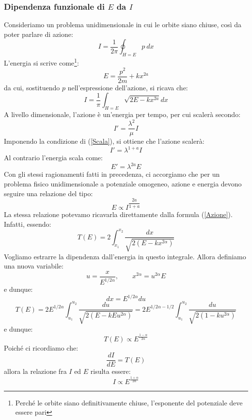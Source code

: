 \documentclass[a4paper,openany]{article}
\begin{document}
	\subsubsection{Dipendenza funzionale di $E$ da $I$}
	Consideriamo un problema unidimensionale in cui le orbite siano chiuse, così da poter parlare di azione:
	\begin{equation}
		I =\dfrac{1}{2\pi} \oint_{H=E} p\>dx
		\label{Azione}
	\end{equation}
	L'energia si scrive come\footnote{Perché le orbite siano definitivamente chiuse, l'esponente del potenziale deve essere pari}:
	$$
	E = \dfrac{p^{2}}{2m} + kx^{2a}
	$$
	da cui, sostituendo $p$ nell'espressione dell'azione, si ricava che:
	\begin{equation}
		I =\dfrac{1}{\pi} \int_{H=E} \sqrt{2E - kx^{2a}}dx
	\end{equation}
	A livello dimensionale, l'azione è un'energia per tempo, per cui scalerà secondo:
	$$
	I' = \dfrac{\lambda^{2}}{\mu} I 
	$$
	Imponendo la condizione di (\ref{Scala}), si ottiene che l'azione scalerà:
	$$
	I' = \lambda^{1+a} I
	$$
	Al contrario l'energia scala come:
	$$
	E' = \lambda^{2a}E
	$$
	Con gli stessi ragionamenti fatti in precedenza, ci accorgiamo che per un problema fisico unidimensionale a potenziale omogeneo, azione e energia devono seguire una relazione del tipo:
	$$
	E \propto I^{\dfrac{2a}{1+a}}
	$$
	La stessa relazione potevamo ricavarla direttamente dalla formula (\ref{Azione}). Infatti, essendo:
	\begin{equation}\label{key}
		T(E) = 2\int_{x_1}^{x_2} \dfrac{dx}{\sqrt{2(E-kx^{2\alpha})}}
	\end{equation}
	Vogliamo estrarre la dipendenza dall'energia in questo integrale. Allora definiamo una nuova variabile:
	$$
	u = \dfrac{x}{E^{1/2\alpha}}, 	\quad \quad x^{2\alpha} = u^{2\alpha} E
	$$
	e dunque:
	$$
	dx = E^{1/2\alpha} du
	$$
	\begin{equation}\label{key}
		T(E) = 2 E^{1/2\alpha} \int_{u_1}^{u_2} \dfrac{du}{\sqrt{2(E-kE u^{2\alpha})}} =  2 E^{1/2\alpha-1/2}\int_{u_1}^{u_2} \dfrac{du}{\sqrt{2(1-ku^{2\alpha})}}
	\end{equation}
	e dunque:
	\begin{equation}
		T(E) \propto E^{\frac{1-\alpha}{2\alpha}}
		\label{Periodo}
	\end{equation}
	Poiché ci ricordiamo che:
	\begin{equation}\label{key}
		\dfrac{dI}{dE} = T(E)
	\end{equation}
	allora la relazione fra $I$ ed $E$ risulta essere:
	\begin{equation}\label{key}
		I  \propto E^{\frac{1+\alpha}{2\alpha}}
	\end{equation}
	
\end{document}
